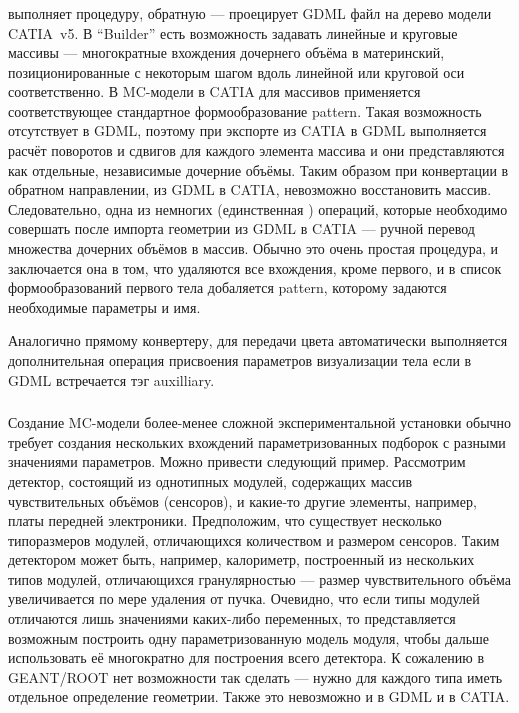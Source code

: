 \subsubsection{}\label{sec:GDML2CATIA}

 выполняет процедуру, обратную  --- проецирует GDML файл на дерево модели CATIA~v5. В ``Builder'' есть возможность задавать линейные и круговые массивы --- многократные вхождения дочернего объёма в материнский, позиционированные с некоторым шагом вдоль линейной или круговой оси соответственно. В MC-модели в CATIA для массивов применяется соответствующее стандартное формообразование pattern. Такая возможность отсутствует в GDML, поэтому при экспорте из CATIA в GDML выполняется расчёт поворотов и сдвигов для каждого элемента массива и они представляются как отдельные, независимые дочерние объёмы. Таким образом при конвертации в обратном направлении, из GDML в CATIA, невозможно восстановить массив. Следовательно, одна из немногих (единственная \todo) операций, которые необходимо совершать после импорта геометрии из GDML в CATIA --- ручной перевод множества дочерних объёмов в массив. Обычно это очень простая процедура, и заключается она в том, что удаляются все вхождения, кроме первого, и в список формообразований первого тела добаляется pattern, которому задаются необходимые параметры и имя.

Аналогично прямому конвертеру, для передачи цвета автоматически выполняется дополнительная операция присвоения параметров визуализации тела если в GDML встречается тэг auxilliary.

\subsubsection{}\label{sec:Duplicator}

Создание MC-модели более-менее сложной экспериментальной установки обычно требует создания нескольких вхождений параметризованных подборок с разными значениями параметров. Можно привести следующий пример. Рассмотрим детектор, состоящий из однотипных модулей, содержащих массив чувствительных объёмов (сенсоров), и какие-то другие элементы, например, платы передней электроники. Предположим, что существует несколько типоразмеров модулей, отличающихся количеством и размером сенсоров. Таким детектором может быть, например, калориметр, построенный из нескольких типов модулей, отличающихся гранулярностью --- размер чувствительного объёма увеличивается по мере удаления от пучка. Очевидно, что если типы модулей отличаются лишь значениями каких-либо переменных, то представляется возможным построить одну параметризованную модель модуля, чтобы дальше использовать её многократно для построения всего детектора. К сожалению в GEANT/ROOT нет возможности так сделать --- нужно для каждого типа иметь отдельное определение геометрии. Также это невозможно и в GDML и в CATIA.

